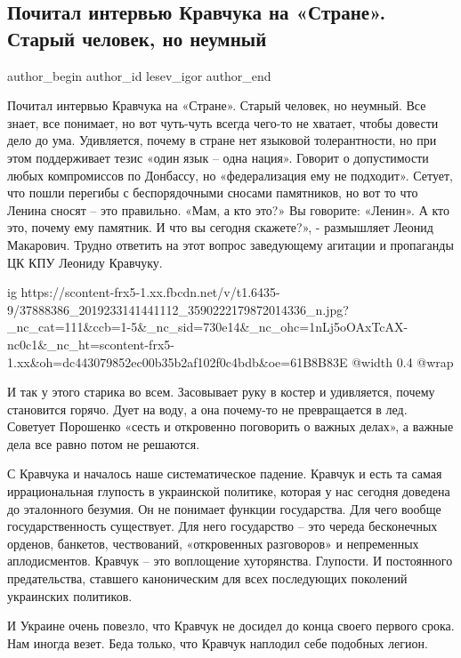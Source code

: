  
 
 
 
 
 
\subsection{Почитал интервью Кравчука на «Стране». Старый человек, но неумный}
\label{sec:28_07_2018.fb.lesev_igor.1.kravchuk_interview_strana}
 
\ifcmt
 author_begin
   author_id lesev_igor
 author_end
\fi

Почитал интервью Кравчука на «Стране». Старый человек, но неумный. Все знает,
все понимает, но вот чуть-чуть всегда чего-то не хватает, чтобы довести дело до
ума. Удивляется, почему в стране нет языковой толерантности, но при этом
поддерживает тезис «один язык – одна нация». Говорит о допустимости любых
компромиссов по Донбассу, но «федерализация ему не подходит». Сетует, что пошли
перегибы с беспорядочными сносами памятников, но вот то что Ленина сносят – это
правильно. «Мам, а кто это?» Вы говорите: «Ленин». А кто это, почему ему
памятник. И что вы сегодня скажете?», - размышляет Леонид Макарович. Трудно
ответить на этот вопрос заведующему агитации и пропаганды ЦК КПУ Леониду
Кравчуку.

\ifcmt
  ig https://scontent-frx5-1.xx.fbcdn.net/v/t1.6435-9/37888386_2019233141441112_3590222179872014336_n.jpg?_nc_cat=111&ccb=1-5&_nc_sid=730e14&_nc_ohc=1nLj5oOAxTcAX-nc0c1&_nc_ht=scontent-frx5-1.xx&oh=dc443079852ec00b35b2af102f0c4bdb&oe=61B8B83E
  @width 0.4
  @wrap 
\fi

И так у этого старика во всем. Засовывает руку в костер и удивляется, почему
становится горячо. Дует на воду, а она почему-то не превращается в лед.
Советует Порошенко «сесть и откровенно поговорить о важных делах», а важные
дела все равно потом не решаются.

С Кравчука и началось наше систематическое падение. Кравчук и есть та самая
иррациональная глупость в украинской политике, которая у нас сегодня доведена
до эталонного безумия. Он не понимает функции государства. Для чего вообще
государственность существует. Для него государство – это череда бесконечных
орденов, банкетов, чествований, «откровенных разговоров» и непременных
аплодисментов. Кравчук – это воплощение хуторянства. Глупости. И постоянного
предательства, ставшего каноническим для всех последующих поколений украинских
политиков.

И Украине очень повезло, что Кравчук не досидел до конца своего первого срока.
Нам иногда везет. Беда только, что Кравчук наплодил себе подобных легион.

